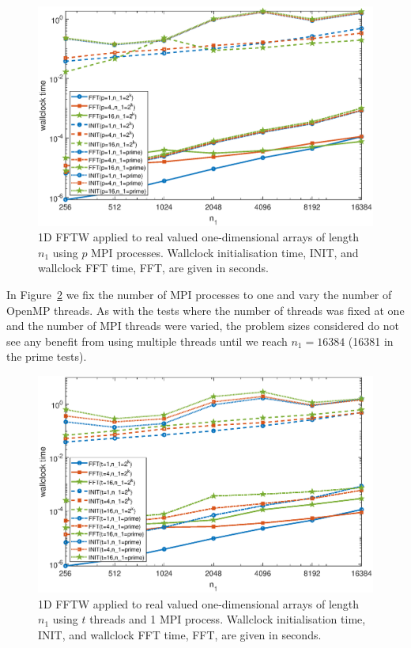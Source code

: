\documentclass[a4]{article}
\begin{document}
\begin{figure}[!htbp]
\begin{center}
 \includegraphics[width=.9\textwidth, height=0.42\textheight]{FFTW1D_times_fig.eps}
\caption{1D FFTW applied to real valued one-dimensional arrays of length $n_1$ using $p$ MPI processes. Wallclock initialisation time, INIT, and wallclock FFT time, FFT, are given in seconds.}
\label{Fig:fftw1d_times}
\end{center}
\end{figure}



In Figure~\ref{Fig:fftw1d_threads_times} we fix the number of MPI processes to one and vary the number of OpenMP threads. As with the tests where the number of threads was fixed at one and the number of MPI threads were varied, the problem sizes considered do not see any benefit from using multiple threads until we reach $n_1=16384$ (16381 in the prime tests). 


\begin{figure}[!htbp]
\begin{center}
 \includegraphics[width=.9\textwidth, height=0.42\textheight]{FFTW1D_threads_times_fig.eps}
\caption{1D FFTW applied to real valued one-dimensional arrays of length $n_1$ using $t$ threads and 1 MPI process. Wallclock initialisation time, INIT, and wallclock FFT time, FFT, are given in seconds.}
\label{Fig:fftw1d_threads_times}
\end{center}
\end{figure}
\end{document}
